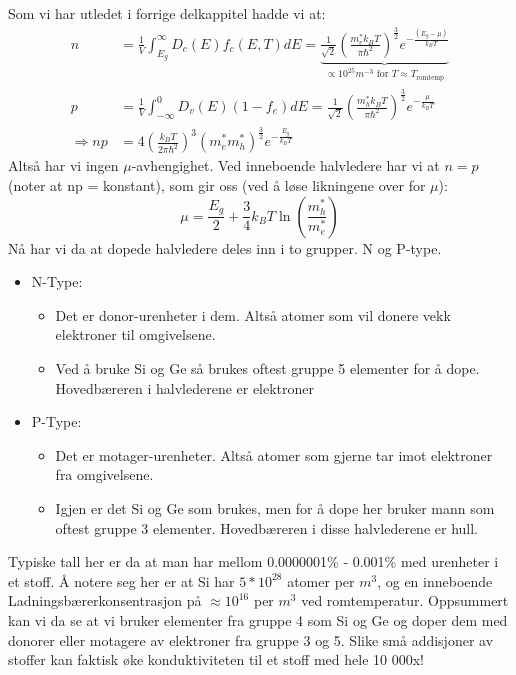 \documentclass{article}
\begin{document}



Som vi har utledet i forrige delkappitel hadde vi at:
\begin{align}
  n &= \frac{1}{V} \int_{E_g}^{\infty} D_c(E) f_c(E, T)dE = \underbrace{\frac{1}{\sqrt{2}} \left( \frac{m_e^{*} k_B T}{\pi \hbar^2}\right)^{\frac{3}{2}} e^{-\frac{(E_g - \mu)}{k_B T}} }_{\propto 10^{25} m^{-3}\text{ for } T \approx T_{\text{romtemp}}} \\
  p &=\frac{1}{V} \int_{-\infty}^0 D_v(E) (1-f_e) dE = \frac{1}{\sqrt{2}} \left( \frac{m_h^{*} k_B T}{\pi \hbar^2}\right)^{\frac{3}{2}} e^{-\frac{\mu}{k_B T}}\\
  \Rightarrow np &= 4 \left(\frac{k_B T}{2 \pi \hbar^2}\right)^3 (m_e^{*} m_h^{*})^{\frac{3}{2}} e^{-\frac{E_g}{k_B T}}
\end{align}
Altså har vi ingen $\mu$-avhengighet. Ved inneboende halvledere har vi at $n=p$ (noter at np = konstant), som gir oss (ved å løse likningene over for $\mu$):
\begin{equation}
  \mu = \frac{E_g}{2} + \frac{3}{4} k_B T \ln{\left(\frac{m_h^{*}}{m_e^{*}}  \right)}
\end{equation}
Nå har vi da at dopede halvledere deles inn i to grupper. N og P-type.
\begin{itemize}
  \item N-Type:
  \begin{itemize}
    \item Det er donor-urenheter i dem. Altså atomer som vil donere vekk elektroner til omgivelsene.
    \item Ved å bruke Si og Ge så brukes oftest gruppe 5 elementer for å dope. Hovedbæreren i halvlederene er elektroner
  \end{itemize}
  \item P-Type: 
  \begin{itemize}
    \item Det er motager-urenheter. Altså atomer som gjerne tar imot elektroner fra omgivelsene.
    \item Igjen er det Si og Ge som brukes, men for å dope her bruker mann som oftest gruppe 3 elementer. Hovedbæreren i disse halvlederene er hull.
  \end{itemize}
\end{itemize}
Typiske tall her er da at man har mellom  0.0000001\% - 0.001\% med urenheter i et stoff. Å notere seg her er at Si har $5 * 10^{28}$ atomer per $m^3$, og en inneboende Ladningsbærerkonsentrasjon på $\approx 10^{16}$ per $m^3$ ved romtemperatur. Oppsummert kan vi da se at vi bruker elementer fra gruppe 4 som Si og Ge og doper dem med donorer eller motagere av elektroner fra gruppe 3 og 5. Slike små addisjoner av stoffer kan faktisk øke konduktiviteten til et stoff med hele 10 000x!
\end{document}

